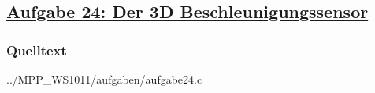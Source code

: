 \subsection*
{\href{http://cst.mi.fu-berlin.de/intern/19606-P-MPP/Aufgaben/040802.html}
{Aufgabe 24: Der 3D Beschleunigungssensor}}

\subsubsection*{Quelltext}


{../MPP_WS1011/aufgaben/aufgabe24.c}
